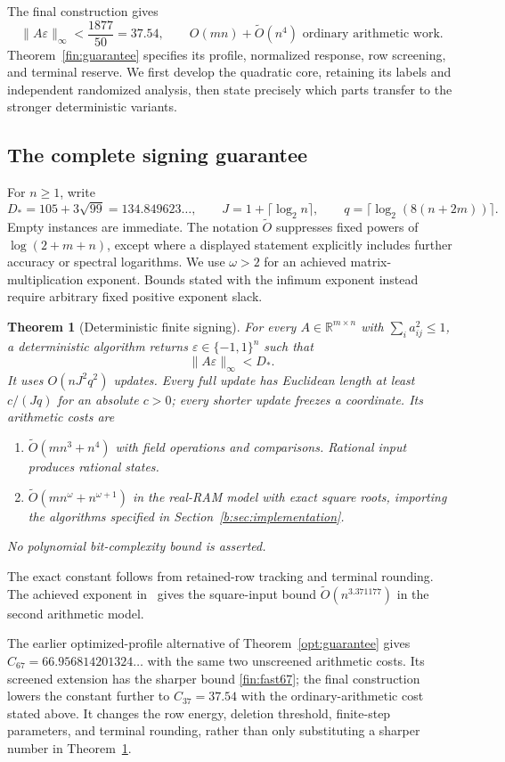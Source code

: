 \documentclass[11pt]{amsart}
\newtheorem{theorem}{Theorem}[section]
\theoremstyle{definition}\newtheorem{definition}[theorem]{Definition}
\theoremstyle{remark}\newtheorem{remark}[theorem]{Remark}
\numberwithin{equation}{section}
\begin{document}
The final construction gives
\[
 \|A\varepsilon\|_\infty<\frac{1877}{50}=37.54,
 \qquad O(mn)+\widetilde O(n^4)\text{ ordinary arithmetic work}.
\]
Theorem~\ref{fin:guarantee} specifies its profile, normalized response,
row screening, and terminal reserve. We first develop the quadratic
core, retaining its labels and independent randomized analysis, then
state precisely which parts transfer to the stronger deterministic variants.

\subsection{The complete signing guarantee}
For $n\ge1$, write
\[
 D_*=105+3\sqrt{99}=134.849623\ldots,\qquad
 J=1+\lceil\log_2n\rceil,\qquad
 q=\lceil\log_2(8(n+2m))\rceil.
\]
Empty instances are immediate. The notation $\widetilde O$ suppresses
fixed powers of $\log(2+m+n)$, except where a displayed statement
explicitly includes further accuracy or spectral logarithms. We use
$\omega>2$ for an achieved matrix-multiplication exponent. Bounds stated
with the infimum exponent instead require arbitrary fixed positive
exponent slack.

\begin{theorem}[Deterministic finite signing]\label{b:thm:main}
For every $A\in\mathbb R^{m\times n}$ with
$\sum_i a_{ij}^2\le1$, a deterministic algorithm returns
$\varepsilon\in\{-1,1\}^n$ such that
\[
 \|A\varepsilon\|_\infty<D_*.
\]
It uses $O(nJ^2q^2)$ updates. Every full update has Euclidean length at
least $c/(Jq)$ for an absolute $c>0$; every shorter update freezes a
coordinate. Its arithmetic costs are
\begin{enumerate}
\item $\widetilde O(mn^3+n^4)$ with field operations and comparisons.
Rational input produces rational states.
\item $\widetilde O(mn^\omega+n^{\omega+1})$ in the real-RAM model
with exact square roots, importing the algorithms specified in
Section~\ref{b:sec:implementation}.
\end{enumerate}
No polynomial bit-complexity bound is asserted.
\end{theorem}

The exact constant follows from retained-row tracking and terminal
rounding. The achieved exponent in~\cite{MM} gives the square-input bound
$\widetilde O(n^{3.371177})$ in the second arithmetic model.

The earlier optimized-profile alternative of Theorem~\ref{opt:guarantee}
gives $C_{67}=66.956814201324\ldots$ with the same two unscreened
arithmetic costs. Its screened extension has the sharper bound
\eqref{fin:fast67}; the final construction lowers the constant further
to $C_{37}=37.54$ with the ordinary-arithmetic cost stated above. It changes the row energy, deletion threshold,
finite-step parameters, and terminal rounding, rather than only
substituting a sharper number in Theorem~\ref{b:thm:main}.
\end{document}
